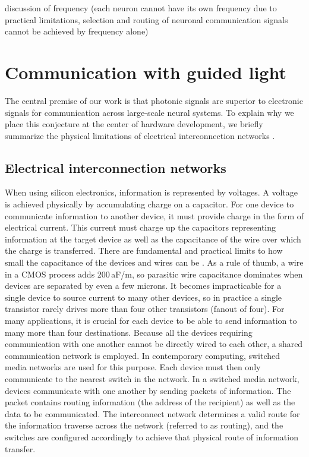 \documentclass[twocolumn]{article}
\begin{document}
discussion of frequency (each neuron cannot have its own frequency due to practical limitations, selection and routing of neuronal communication signals cannot be achieved by frequency alone)


\section{\label{sec:communication}Communication with guided light}
The central premise of our work is that photonic signals are superior to electronic signals for communication across large-scale neural systems. To explain why we place this conjecture at the center of hardware development, we briefly summarize the physical limitations of electrical interconnection networks \cite{hepa2012}.

\subsection{\label{sec:electricalInterconnectionNetworks}Electrical interconnection networks}
When using silicon electronics, information is represented by voltages. A voltage is achieved physically by accumulating charge on a capacitor. For one device to communicate information to another device, it must provide charge in the form of electrical current. This current must charge up the capacitors representing information at the target device as well as the capacitance of the wire over which the charge is transferred. There are fundamental and practical limits to how small the capacitance of the devices and wires can be \cite{}. As a rule of thumb, a wire in a CMOS process adds 200\,aF/\textmu m, so parasitic wire capacitance dominates when devices are separated by even a few microns. It becomes impracticable for a single device to source current to many other devices, so in practice a single transistor rarely drives more than four other transistors (fanout of four). For many applications, it is crucial for each device to be able to send information to many more than four destinations. Because all the devices requiring communication with one another cannot be directly wired to each other, a shared communication network is employed. In contemporary computing, switched media networks are used for this purpose. Each device must then only communicate to the nearest switch in the network. In a switched media network, devices communicate with one another by sending packets of information. The packet contains routing information (the address of the recipient) as well as the data to be communicated. The interconnect network determines a valid route for the information traverse across the network (referred to as routing), and the switches are configured accordingly to achieve that physical route of information transfer. 
\end{document}

